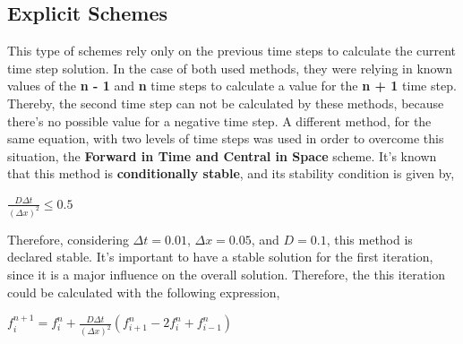 \documentclass[12pt]{report}
\begin{document}
\subsection*{Explicit Schemes}

\par This type of schemes rely only on the previous time steps to calculate the current time step solution. In the case of both used methods, they were relying in known values of the \textbf{n - 1} and \textbf{n} time steps to calculate a value for the \textbf{n + 1} time step. Thereby, the second time step can not be calculated by these methods, because there's no possible value for a negative time step. A different method, for the same equation, with two levels of time steps was used in order to overcome this situation, the \textbf{Forward in Time and Central in Space} scheme. It's known that this method is \textbf{conditionally stable}, and its stability condition is given by,

\begin{center}
\Large
$
\frac{D \Delta t}{(\Delta x)^2} \leq 0.5
$
\end{center}

Therefore, considering $\Delta t = 0.01$, $\Delta x = 0.05$, and $D = 0.1$, this method is declared stable. It's important to have a stable solution for the first iteration, since it is a major influence on the overall solution. Therefore, the this iteration could be calculated with the following expression,

\begin{center}
\Large
$
f_{i}^{n + 1} = f_{i}^{n} + \frac{D \Delta t}{(\Delta x)^2}(f_{i + 1}^{n} - 2f_{i}^{n} + f_{i - 1}^{n})
$
\end{center}
\end{document}
